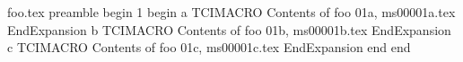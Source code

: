 foo.tex preamble
begin
1
begin
a
TCIMACRO
Contents of foo 01a, ms00001a.tex
EndExpansion
b
TCIMACRO
Contents of foo 01b, ms00001b.tex
EndExpansion
c
TCIMACRO
Contents of foo 01c, ms00001c.tex
EndExpansion
end
end
